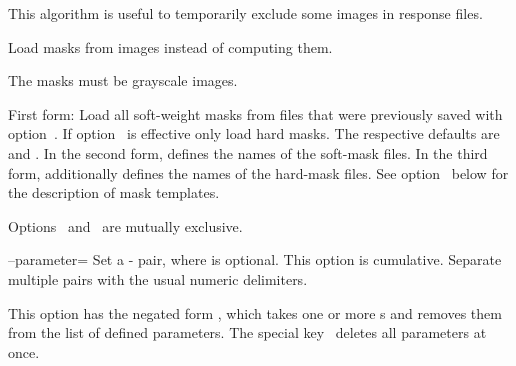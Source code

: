\begin{codelist}
\begin{codelist}
    This algorithm is useful to temporarily exclude some images in response files.
  \end{codelist}


\ifenfuse
  \label{opt:load-masks}%
  \item[\itempar{--load-masks~\textrm{(\oldstylefirst~form)}
      \\ --load-masks=\metavar{SOFT-MASK-TEMPLATE}~\textrm{(\oldstylesecond~form)}
      \\ --load-masks=\metavar{SOFT-MASK-TEMPLATE}:\feasiblebreak
      \metavar{HARD-MASK-TEMPLATE}~\textrm{(\oldstylethird~form)}}]\itemend
    Load masks from images instead of
    computing them.

    The masks must be grayscale images.

    \begin{sloppypar}
      First form: Load all soft-weight masks from files that were previously saved with
      option~.  If option~ is effective only load hard
      masks.  The respective defaults are \mbox{} and
      \mbox{}. In the second form,
       defines the names of the soft-mask files.  In the
      third form,  additionally defines the names of the
      hard-mask files.  See option~ below for the description of mask
      templates.
    \end{sloppypar}

    Options~ and~ are mutually exclusive.
\fi


  \label{opt:parameter}%
\item[--parameter=\metavar{KEY}\optional{=\metavar{VALUE}}\optional{:\dots}]\itemend
  Set a - pair, where  is optional.  This option is
  cumulative.  Separate multiple pairs with the usual numeric delimiters.

  This option has the negated form %
  , which takes one or more s and removes them from the list
  of defined parameters.  The special key~\sample{*} deletes all parameters at once.


\end{codelist}
